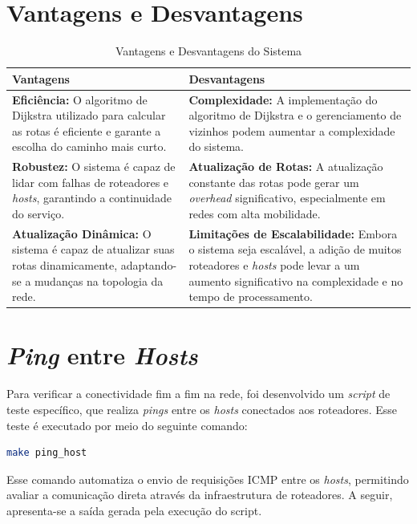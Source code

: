 \documentclass[12pt,a4paper]{report}
\begin{document}
\section{Vantagens e Desvantagens}
\begin{table}[h!]
\centering
\caption{Vantagens e Desvantagens do Sistema}
\begin{tabular}{|p{7cm}|p{7cm}|}
\hline
\textbf{Vantagens} & \textbf{Desvantagens} \\
\hline
\textbf{Eficiência:} O algoritmo de Dijkstra utilizado para calcular as rotas é eficiente e garante a escolha do caminho mais curto. 
& 
\textbf{Complexidade:} A implementação do algoritmo de Dijkstra e o gerenciamento de vizinhos podem aumentar a complexidade do sistema. \\
\hline
\textbf{Robustez:} O sistema é capaz de lidar com falhas de roteadores e \textit{hosts}, garantindo a continuidade do serviço.
&
\textbf{Atualização de Rotas:} A atualização constante das rotas pode gerar um \textit{overhead} significativo, especialmente em redes com alta mobilidade. \\
\hline
\textbf{Atualização Dinâmica:} O sistema é capaz de atualizar suas rotas dinamicamente, adaptando-se a mudanças na topologia da rede.
&
\textbf{Limitações de Escalabilidade:} Embora o sistema seja escalável, a adição de muitos roteadores e \textit{hosts} pode levar a um aumento significativo na complexidade e no tempo de processamento. \\
\hline
\end{tabular}
\end{table}

\section{\textit{Ping} entre \textit{Hosts}}

Para verificar a conectividade fim a fim na rede, foi desenvolvido um \textit{script} de teste específico, que realiza \textit{pings} entre os \textit{hosts} conectados aos roteadores. Esse teste é executado por meio do seguinte comando:

\begin{lstlisting}[language=bash]
make ping_host
\end{lstlisting}

Esse comando automatiza o envio de requisições ICMP entre os \textit{hosts}, permitindo avaliar a comunicação direta através da infraestrutura de roteadores. A seguir, apresenta-se a saída gerada pela execução do script.
\end{document}
